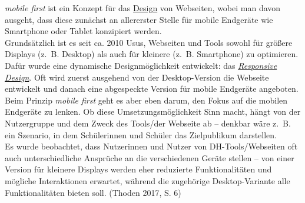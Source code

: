 \documentclass{article}
\begin{document}
    \emph{mobile first} ist ein Konzept für das \href{http://gams.uni-graz.at/o:konde.56}{Design} von Webseiten, wobei man davon ausgeht, dass diese zunächst an allererster Stelle für mobile Endgeräte wie Smartphone oder Tablet konzipiert werden.\\
            
        Grundsätzlich ist es seit ca. 2010 Usus, Webseiten und Tools sowohl für größere Displays (z. B. Desktop) als auch für kleinere (z. B. Smartphone) zu optimieren. Dafür wurde eine dynamische Designmöglichkeit entwickelt: das \emph{\href{http://gams.uni-graz.at/o:konde.164}{Responsive Design}}. Oft wird zuerst ausgehend von der Desktop-Version die Webseite entwickelt und danach eine abgespeckte Version für mobile Endgeräte angeboten. Beim Prinzip \emph{mobile first} geht es aber eben darum, den Fokus auf die mobilen Endgeräte zu lenken. Ob diese Umsetzungsmöglichkeit Sinn macht, hängt von der Nutzergruppe und dem Zweck des Tools/der Webseite ab – denkbar wäre z. B. ein Szenario, in dem Schülerinnen und Schüler das Zielpublikum darstellen.\\
            
        Es wurde beobachtet, dass Nutzerinnen und Nutzer von DH-Tools/Webseiten oft auch unterschiedliche Ansprüche an die verschiedenen Geräte stellen – von einer Version für kleinere Displays werden eher reduzierte Funktionalitäten und mögliche Interaktionen erwartet, während die zugehörige Desktop-Variante alle Funktionalitäten bieten soll. (Thoden 2017, S. 6)\\
            
\end{document}
